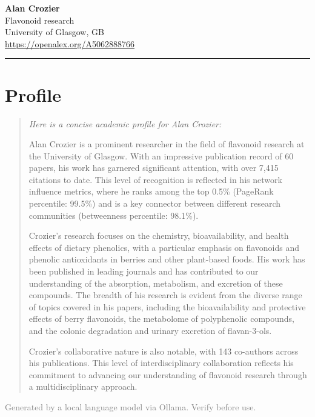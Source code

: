 \documentclass[a4paper,11pt]{article}
\begin{document}
\begin{center}
  {\LARGE\bfseries Alan Crozier}\\[0.4em]
  {\large\color{accent} Flavonoid research}\\[0.25em]
  {\normalsize University of Glasgow, GB}\\[0.15em]
  {\small\url{https://openalex.org/A5062888766}}
\end{center}
\vspace{0.4em}\noindent\rule{\linewidth}{0.5pt}\vspace{0.4em}


\section*{Profile}
\begin{quote}
\itshape
Here is a concise academic profile for Alan Crozier:

Alan Crozier is a prominent researcher in the field of flavonoid research at the University of Glasgow. With an impressive publication record of 60 papers, his work has garnered significant attention, with over 7,415 citations to date. This level of recognition is reflected in his network influence metrics, where he ranks among the top 0.5\% (PageRank percentile: 99.5\%) and is a key connector between different research communities (betweenness percentile: 98.1\%).

Crozier's research focuses on the chemistry, bioavailability, and health effects of dietary phenolics, with a particular emphasis on flavonoids and phenolic antioxidants in berries and other plant-based foods. His work has been published in leading journals and has contributed to our understanding of the absorption, metabolism, and excretion of these compounds. The breadth of his research is evident from the diverse range of topics covered in his papers, including the bioavailability and protective effects of berry flavonoids, the metabolome of polyphenolic compounds, and the colonic degradation and urinary excretion of flavan-3-ols.

Crozier's collaborative nature is also notable, with 143 co-authors across his publications. This level of interdisciplinary collaboration reflects his commitment to advancing our understanding of flavonoid research through a multidisciplinary approach.
\end{quote}
{\small\textcolor{gray}{Generated by a local language model via Ollama. Verify before use.}}
\bigskip
\end{document}
